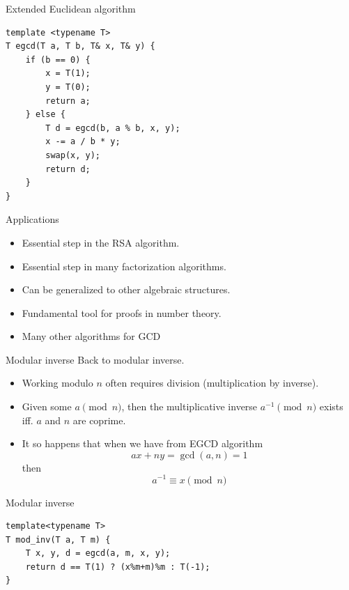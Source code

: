 \documentclass{beamer}
\begin{document}
\begin{frame}{Extended Euclidean algorithm}
  \vspace{10pt}
    \begin{verbatim}
template <typename T>
T egcd(T a, T b, T& x, T& y) {
    if (b == 0) {
        x = T(1);
        y = T(0);
        return a;
    } else {
        T d = egcd(b, a % b, x, y);
        x -= a / b * y;
        swap(x, y);
        return d;
    }
}
    \end{verbatim}
\end{frame}

\begin{frame}[plain]{Applications}
  \vspace{40pt}
  \begin{itemize}
    \item Essential step in the RSA algorithm.
    \item Essential step in many factorization algorithms.
    \item Can be generalized to other algebraic structures.
    \item Fundamental tool for proofs in number theory.
    \item Many other algorithms for GCD
  \end{itemize}
\end{frame}

\begin{frame}[plain]{Modular inverse}
  \vspace{20pt}
  Back to modular inverse.
  \begin{itemize}
    \item Working modulo $n$ often requires division (multiplication by inverse).
    \item Given some $a \pmod{n}$, then the multiplicative inverse $a^{-1}
      \pmod{n}$ exists iff. $a$ and $n$ are coprime.
    \item It so happens that when we have from EGCD algorithm
      \[
        ax + ny = \gcd(a,n) = 1
      \]
      then \[ a^{-1} \equiv x \pmod{n} \]
  \end{itemize}
\end{frame}

\begin{frame}{Modular inverse}
    \begin{verbatim}
template<typename T>
T mod_inv(T a, T m) {
    T x, y, d = egcd(a, m, x, y);
    return d == T(1) ? (x%m+m)%m : T(-1);
}
\end{verbatim}
\end{frame}
\end{document}
